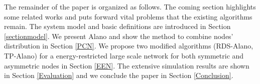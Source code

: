 The remainder of the paper is organized as follows. The coming section highlights some related works and puts forward vital problems that the existing algorithms remain. The system model and basic definitions are introduced in Section \ref{sectionmodel}. We present Alano and show the method to combine nodes' distribution in Section \ref{PCN}. We propose two modified algorithms (RDS-Alano, TP-Alano) for a energy-restricted large scale network for both symmetric and asymmetric nodes in Section \ref{EEN}. The extensive simulation results are shown in Section \ref{Evaluation} and we conclude the paper in Section \ref{Conclusion}.
%
%
%
%
%
